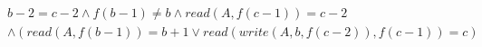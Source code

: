 \begin{align*}
%
& %
b - 2 = c - 2
%
\land
%
f(b - 1)  \neq  b
%
\land
%
\mathit{read}(A,f(c - 1)) = c - 2
~\\~
& %
%
\land
%
(\mathit{read}(A,f(b - 1)) = b + 1 \lor \mathit{read}(\mathit{write}(A,b,f(c - 2)),f(c - 1)) = c)
%
\end{align*}
